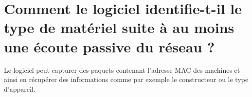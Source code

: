 \section{Comment le logiciel identifie-t-il le type de matériel suite à au moins une écoute passive du réseau ? }

Le logiciel peut capturer des paquets contenant l'adresse MAC des machines et ainsi en récupérer des informations comme par exemple le constructeur ou le type d'appareil.